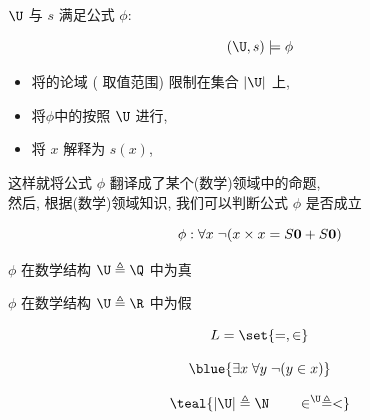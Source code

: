 \begin{frame}{}
  \begin{definition}
    \begin{center}
      $\U$ 与 $s$ 满足公式 $\phi$:
    \end{center}
    \[
      (\U, s) \models \phi
    \]
    \begin{itemize}
      \setlength{\itemsep}{6pt}
      \item 将的论域 ( 取值范围) 限制在集合 $|\U|$ 上,
      \item 将$\phi$中的按照 $\U$ 进行,
      \item 将 $x$ 解释为 $s(x)$,
    \end{itemize}
    \begin{center}
      这样就将公式 $\phi$ 翻译成了某个(数学)领域中的命题, \\[6pt]
      然后, 根据(数学)领域知识, 我们可以判断公式 $\phi$ 是否成立
    \end{center}
  \end{definition}
\end{frame}

\begin{frame}{}
  \[
    \phi: \forall x\; \lnot (x \times x = S{\bf 0} + S{\bf 0})
  \]

  \pause
  \vspace{0.80cm}
  \begin{center}
    $\phi$ 在数学结构 $\U \triangleq \Q$ 中为真

    \vspace{0.60cm}

    $\phi$ 在数学结构 $\U \triangleq \R$ 中为假
  \end{center}
\end{frame}

\begin{frame}{}
  \[
    L = \set{=, \in}
  \]

  \pause
  \[
    \blue{\exists x\; \forall y\; \lnot(y \in x)}
  \]

  \pause
  \[
    \teal{|\U| \triangleq \N \qquad \in^{\U} \triangleq <}
  \]
\end{frame}

